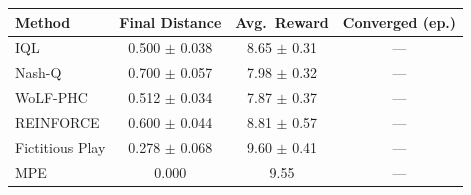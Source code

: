 \begin{tabular}{lccc}
\hline
Method & Final Distance & Avg.\ Reward & Converged (ep.) \\
\hline
IQL & 0.500 $\pm$ 0.038 & 8.65 $\pm$ 0.31 & --- \\
Nash-Q & 0.700 $\pm$ 0.057 & 7.98 $\pm$ 0.32 & --- \\
WoLF-PHC & 0.512 $\pm$ 0.034 & 7.87 $\pm$ 0.37 & --- \\
REINFORCE & 0.600 $\pm$ 0.044 & 8.81 $\pm$ 0.57 & --- \\
Fictitious Play & 0.278 $\pm$ 0.068 & 9.60 $\pm$ 0.41 & --- \\
\hline
MPE & 0.000 & 9.55 & --- \\
\hline
\end{tabular}
